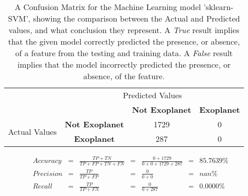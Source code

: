 
    \renewcommand{\arraystretch}{2}
    \renewcommand{\tabcolsep}{20.25pt}
    \begin{table}[ht]
    \begin{tabular}{cccc}
     & \multicolumn{3}{c}{Predicted Values} \\ \cline{3-4}
     & \multicolumn{1}{c|}{} & \multicolumn{1}{c|}{\textbf{Not Exoplanet}} & \multicolumn{1}{c|}{\textbf{Exoplanet}} \\ \cline{2-4}
    \multicolumn{1}{c|}{\multirow{2}{2.0cm}{Actual Values}} & \multicolumn{1}{c|}{\textbf{Not Exoplanet}} & \multicolumn{1}{c|}{1729} & \multicolumn{1}{c|}{0} \\ \cline{2-4}
    \multicolumn{1}{c|}{} & \multicolumn{1}{c|}{\textbf{Exoplanet}} & \multicolumn{1}{c|}{287} & \multicolumn{1}{c|}{0} \\ \cline{2-4}
    \end{tabular}
    \caption{A Confusion Matrix for the Machine Learning model 'sklearn-SVM', showing the comparison between the Actual and Predicted values, and what conclusion they represent. A \emph{True} result implies that the given model correctly predicted the presence, or absence, of a feature from the testing and training data. A \emph{False} result implies that the model incorrectly predicted the presence, or absence, of the feature.}
    \label{tab:sklearn-SVMconfusionmatrix}
    \end{table}

    \label{eq:precisionsklearn-SVM}
    \begin{align*}
        Accuracy &= &\frac{TP + TN}{TP + FP + TN + FN} &= &\frac{0 + 1729}{0 + 0 + 1729 + 287} &= & 85.7639\% \\
        Precision &= &\frac{TP}{TP + FP} &= &\frac{0}{0 + 0} &= & nan\% \\
        Recall &= &\frac{TP}{TP + FN} &= &\frac{0}{0 + 287} &= & 0.0000\% \\
    \end{align*}

    \renewcommand{\arraystretch}{1}
    \renewcommand{\tabcolsep}{5.25pt}
    